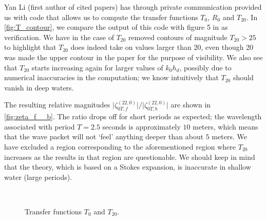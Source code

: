 \documentclass[internal]{sintefmemo}
\begin{document}
\label{eq:zeta}%
Yan Li (first author of cited papers) has through private communication provided us with code that allows us to compute the transfer functions $T_0$, $R_0$ and $T_{20}$.
In \autoref{fig:T_contour}, we compare the output of this code with figure 5 in \citet{li_2021_step1}  as verification.
We have in the case of $T_{20}$ removed contours of magnitude $T_{20}>25$ to highlight that $T_{20}$ does indeed take on values larger than 20, even though 20 was made the upper contour in the paper for the purpose of visibility. 
We also see that  $T_{20}$ starts increasing again for larger values of $k_0 h_d$, possibly due to numerical inaccuracies in the computation;
we know intuitively that $T_{20}$ should vanish in deep waters.

The resulting relative magnitudes $\big|\zeta_{0T,f}^{(22,0)}\big|\big/\big|\zeta_{0T,b}^{(22,0)}\big|$ are shown in \autoref{fig:zeta_f__b}.
The ratio drops off for short periods as expected;
the wavelength associated with period $T=2.5$ seconds is approximately $10$ meters, which means that the wave packet will not `feel' anything deeper than about $5$ meters.
We have excluded a region corresponding to the aforementioned region where $T_{20}$ increases as the results in that region are questionable.
We should keep in mind that the theory, which is based on a Stokes expansion, is inaccurate in shallow water (large periods).

\begin{figure}[H]%
\centering
{}\\
\caption{Transfer functions $T_0$ and $T_{20}$.}%
\label{fig:T_contour}%
\end{figure}
\end{document}
